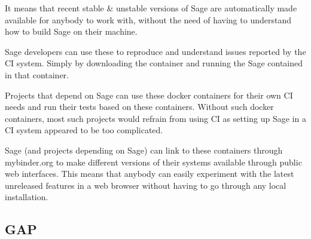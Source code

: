 \documentclass{deliverablereport}
\begin{document}
It means that recent stable \& unstable versions of Sage are automatically made
available for anybody to work with, without the need of having to understand
how to build Sage on their machine.

Sage developers can use these to reproduce and understand issues
reported by the CI system. Simply by downloading the container and running the
Sage contained in that container.

Projects that depend on Sage can use these docker containers for their own CI
needs and run their tests based on these containers. Without such docker
containers, most such projects would refrain from using CI as setting up Sage
in a CI system appeared to be too complicated.

Sage (and projects depending on Sage) can link to these containers through
mybinder.org  to make
different versions of their systems available through public web interfaces.
This means that anybody can easily experiment with the latest unreleased
features in a web browser without having to go through any local installation.

\subsection{GAP}

% 
\end{document}
